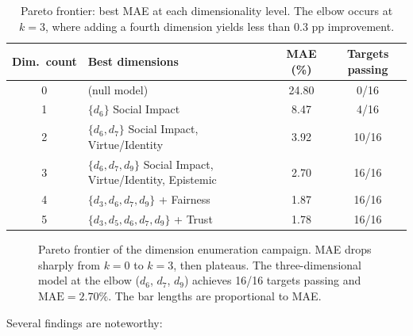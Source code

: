 \documentclass[12pt]{article}
\newcommand{\MAE}{\mathrm{MAE}}
\begin{document}
\begin{table}[H]
\centering
\caption{Pareto frontier: best MAE at each dimensionality level.  The elbow occurs at $k=3$, where adding a fourth dimension yields less than 0.3 pp improvement.}
\label{tab:pareto}
\begin{tabular}{@{}clcc@{}}
\toprule
\textbf{Dim.\ count} & \textbf{Best dimensions} & \textbf{MAE (\%)} & \textbf{Targets passing} \\
\midrule
0 & (null model) & 24.80 & 0/16 \\
1 & $\{d_6\}$ Social Impact & 8.47 & 4/16 \\
2 & $\{d_6, d_7\}$ Social Impact, Virtue/Identity & 3.92 & 10/16 \\
3 & $\{d_6, d_7, d_9\}$ Social Impact, Virtue/Identity, Epistemic & 2.70 & 16/16 \\
4 & $\{d_3, d_6, d_7, d_9\}$ + Fairness & 1.87 & 16/16 \\
5 & $\{d_3, d_5, d_6, d_7, d_9\}$ + Trust & 1.78 & 16/16 \\
\bottomrule
\end{tabular}
\end{table}

\begin{figure}[H]
\centering
{}
\caption{Pareto frontier of the dimension enumeration campaign.  MAE drops sharply from $k=0$ to $k=3$, then plateaus.  The three-dimensional model at the elbow ($d_6$, $d_7$, $d_9$) achieves 16/16 targets passing and $\MAE = 2.70\%$.  The bar lengths are proportional to MAE.}
\label{fig:pareto}
\end{figure}

Several findings are noteworthy:
\end{document}
